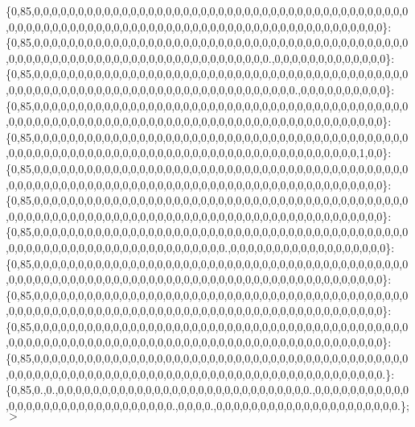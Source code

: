 \{0,85,0,0,0,0,0,0,0,0,0,0,0,0,0,0,0,0,0,0,0,0,0,0,0,0,0,0,0,0,0,0,0,0,0,0,0,0,0,0,0,0,0,0,0,0,0,0,0,0,0,0,0,0,0,0,0,0,0,0,0,0,0,0,0,0,0,0,0,0,0,0,0,0,0,0,0,0,0,0,0,0,0,0,0,0,0,0\}\+: \{0,85,0,0,0,0,0,0,0,0,0,0,0,0,0,0,0,0,0,0,0,0,0,0,0,0,0,0,0,0,0,0,0,0,0,0,0,0,0,0,0,0,0,0,0,0,0,0,0,0,0,0,0,0,0,0,0,0,0,0,0,0,0,0,0,0,0,0,0,0,0,0,0,0,0.,0,0,0,0,0,0,0,0,0,0,0,0,0\}\+: \{0,85,0,0,0,0,0,0,0,0,0,0,0,0,0,0,0,0,0,0,0,0,0,0,0,0,0,0,0,0,0,0,0,0,0,0,0,0,0,0,0,0,0,0,0,0,0,0,0,0,0,0,0,0,0,0,0,0,0,0,0,0,0,0,0,0,0,0,0,0,0,0,0,0,0,0,0,0.,0,0,0,0,0,0,0,0,0,0\}\+: \{0,85,0,0,0,0,0,0,0,0,0,0,0,0,0,0,0,0,0,0,0,0,0,0,0,0,0,0,0,0,0,0,0,0,0,0,0,0,0,0,0,0,0,0,0,0,0,0,0,0,0,0,0,0,0,0,0,0,0,0,0,0,0,0,0,0,0,0,0,0,0,0,0,0,0,0,0,0,0,0,0,0,0,0,0,0,0,0\}\+: \{0,85,0,0,0,0,0,0,0,0,0,0,0,0,0,0,0,0,0,0,0,0,0,0,0,0,0,0,0,0,0,0,0,0,0,0,0,0,0,0,0,0,0,0,0,0,0,0,0,0,0,0,0,0,0,0,0,0,0,0,0,0,0,0,0,0,0,0,0,0,0,0,0,0,0,0,0,0,0,0,0,0,0,0,0,1,0,0\}\+: \{0,85,0,0,0,0,0,0,0,0,0,0,0,0,0,0,0,0,0,0,0,0,0,0,0,0,0,0,0,0,0,0,0,0,0,0,0,0,0,0,0,0,0,0,0,0,0,0,0,0,0,0,0,0,0,0,0,0,0,0,0,0,0,0,0,0,0,0,0,0,0,0,0,0,0,0,0,0,0,0,0,0,0,0,0,0,0,0\}\+: \{0,85,0,0,0,0,0,0,0,0,0,0,0,0,0,0,0,0,0,0,0,0,0,0,0,0,0,0,0,0,0,0,0,0,0,0,0,0,0,0,0,0,0,0,0,0,0,0,0,0,0,0,0,0,0,0,0,0,0,0,0,0,0,0,0,0,0,0,0,0,0,0,0,0,0,0,0,0,0,0,0,0,0,0,0,0,0,0\}\+: \{0,85,0,0,0,0,0,0,0,0,0,0,0,0,0,0,0,0,0,0,0,0,0,0,0,0,0,0,0,0,0,0,0,0,0,0,0,0,0,0,0,0,0,0,0,0,0,0,0,0,0,0,0,0,0,0,0,0,0,0,0,0,0,0,0,0,0,0,0,0.,0,0,0,0,0,0,0,0,0,0,0,0,0,0,0,0,0,0\}\+: \{0,85,0,0,0,0,0,0,0,0,0,0,0,0,0,0,0,0,0,0,0,0,0,0,0,0,0,0,0,0,0,0,0,0,0,0,0,0,0,0,0,0,0,0,0,0,0,0,0,0,0,0,0,0,0,0,0,0,0,0,0,0,0,0,0,0,0,0,0,0,0,0,0,0,0,0,0,0,0,0,0,0,0,0,0,0,0,0\}\+: \{0,85,0,0,0,0,0,0,0,0,0,0,0,0,0,0,0,0,0,0,0,0,0,0,0,0,0,0,0,0,0,0,0,0,0,0,0,0,0,0,0,0,0,0,0,0,0,0,0,0,0,0,0,0,0,0,0,0,0,0,0,0,0,0,0,0,0,0,0,0,0,0,0,0,0,0,0,0,0,0,0,0,0,0,0,0,0,0\}\+: \{0,85,0,0,0,0,0,0,0,0,0,0,0,0,0,0,0,0,0,0,0,0,0,0,0,0,0,0,0,0,0,0,0,0,0,0,0,0,0,0,0,0,0,0,0,0,0,0,0,0,0,0,0,0,0,0,0,0,0,0,0,0,0,0,0,0,0,0,0,0,0,0,0,0,0,0,0,0,0,0,0,0,0,0,0,0,0,0\}\+: \{0,85,0,0,0,0,0,0,0,0,0,0,0,0,0,0,0,0,0,0,0,0,0,0,0,0,0,0,0,0,0,0,0,0,0,0,0,0,0,0,0,0,0,0,0,0,0,0,0,0,0,0,0,0,0,0,0,0,0,0,0,0,0,0,0,0,0,0,0,0,0,0,0,0,0,0,0,0,0,0,0,0,0,0,0,0,0,0.\}\+: \{0,85,0.,0.,0,0,0,0,0,0,0,0,0,0,0,0,0,0,0,0,0,0,0,0,0,0,0,0,0,0,0,0,0.,0,0,0,0,0,0,0,0,0,0,0,0,0,0,0,0,0,0,0,0,0,0,0,0,0,0,0,0,0,0.,0,0,0,0.,0,0,0,0,0,0,0,0,0,0,0,0,0,0,0,0,0,0,0,0,0.\}; $>$ 